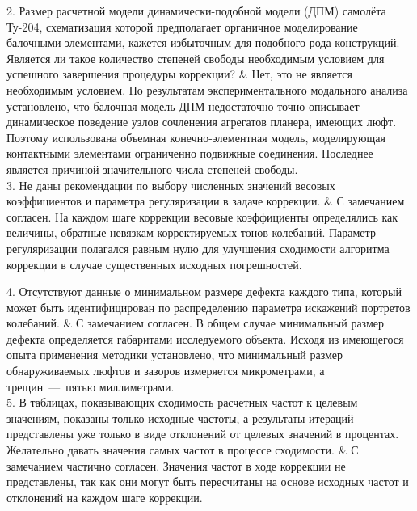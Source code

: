 \begin{frame}
	\vspace{0.3em}
	\begin{comtblr}{15em}
		2. Размер расчетной модели динамически-подобной модели (ДПМ) самолёта \mbox{Ту-204}, схематизация которой предполагает органичное моделирование балочными элементами, кажется избыточным для подобного рода конструкций. Является ли такое количество степеней свободы необходимым условием для успешного завершения процедуры коррекции?
		& 
		Нет, это не является необходимым условием. По результатам экспериментального модального анализа установлено, что балочная модель ДПМ недостаточно точно описывает динамическое поведение узлов сочленения агрегатов планера, имеющих люфт. Поэтому использована объемная конечно-элементная модель, моделирующая контактными элементами ограниченно подвижные соединения. Последнее является причиной значительного числа степеней свободы. \\
		3. Не даны рекомендации по выбору численных значений весовых коэффициентов и параметра регуляризации в задаче коррекции.
		&
		С замечанием согласен. На каждом шаге коррекции весовые коэффициенты определялись как величины, обратные невязкам корректируемых тонов колебаний. Параметр регуляризации полагался равным нулю для улучшения сходимости алгоритма коррекции в случае существенных исходных погрешностей. 
	\end{comtblr}
\end{frame}

\begin{frame}
	\vspace{1em}
	\begin{comtblr}{}
		4. Отсутствуют данные о минимальном размере дефекта каждого типа, который может быть идентифицирован по распределению параметра искажений портретов колебаний.
		&
		С замечанием согласен. В общем случае минимальный размер дефекта определяется габаритами исследуемого объекта. Исходя из имеющегося опыта применения методики установлено, что минимальный размер обнаруживаемых люфтов и зазоров измеряется микрометрами, а трещин~---~пятью миллиметрами. \\
		5. В таблицах, показывающих сходимость расчетных частот к целевым значениям, показаны только исходные частоты, а результаты итераций представлены уже только в виде отклонений от целевых значений в процентах. Желательно давать значения самых частот в процессе сходимости.
		& 
		С замечанием частично согласен. Значения частот в ходе коррекции не представлены, так как они могут быть пересчитаны на основе исходных частот и отклонений на каждом шаге коррекции. 
	\end{comtblr}
\end{frame}

